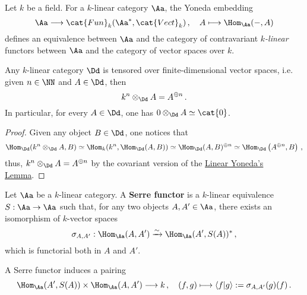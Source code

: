 
\begin{thm}\label{linear-yoneda}
    Let $k$ be a field. For a $k$-linear category $\Aa$, 
    the Yoneda embedding
    \begin{equation*}
        \Aa \longrightarrow \cat{Fun}_{k}(\Aa^{*},\cat{Vect}_{k})\,, \quad
        A \longmapsto \Hom_{\Aa}(-,A)
    \end{equation*}
    defines an equivalence between $\Aa$ and
    the category of contravariant \emph{$k$-linear} functors
    between $\Aa$ and the category of vector spaces over $k$.
\end{thm}

\begin{lemma}\label{tensor-w-zero}
    Any $k$-linear category $\Dd$ is tensored over
    finite-dimensional vector spaces, i.e.
    given $n \in \NN$ and $A \in \Dd$,
    then
    \begin{equation*}
        k^{n} \otimes_{\Dd} A = A^{\oplus n}\,.
    \end{equation*}
    In particular, for every $A \in \Dd$, one has
    $0 \otimes_{\Dd} A \simeq \cat{0}$.
    \begin{proof}
        Given any object $B \in \Dd$, one notices that
        \begin{align*}
            \Hom_{\Dd}(k^{n} \otimes_{\Dd} A, B)
            \simeq \Hom_{k}(k^{n}, \Hom_{\Dd}(A,B)) 
            \simeq \Hom_{\Dd}(A,B)^{\oplus n}
            \simeq \Hom_{\Dd}\left( A^{\oplus n}, B \right)\,,
        \end{align*}
        thus, $k^{n} \otimes_{\Dd} A = A^{\oplus n}$ 
        by the covariant version of the \hyperref[linear-yoneda]{Linear Yoneda's Lemma}.
    \end{proof}
\end{lemma}

\begin{df}
    Let $\Aa$ be a $k$-linear category.
    A \textbf{Serre functor} is a $k$-linear equivalence
    $S : \Aa \to \Aa$ such that, for any two objects
    $A,A' \in \Aa$, there exists an isomorphism
    of $k$-vector spaces
    \begin{equation*}
        \sigma_{A,A'} : \Hom_{\Aa}(A,A') 
        \xrightarrow[]{\sim} \Hom_{\Aa}(A',S(A))^*\,,
    \end{equation*}
    which is functorial both in $A$ and $A'$.
\end{df}

A Serre functor induces a pairing
\begin{equation*}
    \Hom_{\Aa}(A',S(A)) \times \Hom_{\Aa}(A,A') \longrightarrow k\,,
    \quad (f,g) \longmapsto \langle f | g \rangle 
    := \sigma_{A,A'}(g)(f)\,.
\end{equation*}

